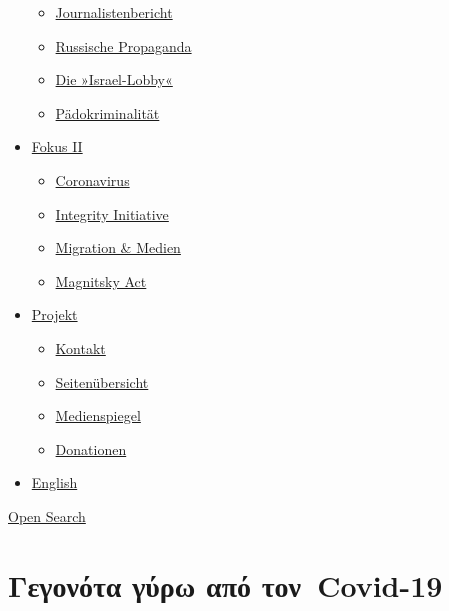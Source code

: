 \begin{itemize}
  \begin{itemize}
  \tightlist
  \item
    \href{https://swprs.org/bericht-eines-journalisten/}{Journalistenbericht}
  \item
    \href{https://swprs.org/russische-propaganda/}{Russische Propaganda}
  \item
    \href{https://swprs.org/die-israel-lobby-fakten-und-mythen/}{Die
    »Israel-Lobby«}
  \item
    \href{https://swprs.org/geopolitik-und-paedokriminalitaet/}{Pädokriminalität}
  \end{itemize}
\item
  \href{https://swprs.org/migration-und-medien/}{Fokus II}

  \begin{itemize}
  \tightlist
  \item
    \href{https://swprs.org/covid-19-hinweis-ii/}{Coronavirus}
  \item
    \href{https://swprs.org/die-integrity-initiative/}{Integrity
    Initiative}
  \item
    \href{https://swprs.org/migration-und-medien/}{Migration \& Medien}
  \item
    \href{https://swprs.org/der-fall-magnitsky/}{Magnitsky Act}
  \end{itemize}
\item
  \href{https://swprs.org/kontakt/}{Projekt}

  \begin{itemize}
  \tightlist
  \item
    \href{https://swprs.org/kontakt/}{Kontakt}
  \item
    \href{https://swprs.org/uebersicht/}{Seitenübersicht}
  \item
    \href{https://swprs.org/medienspiegel/}{Medienspiegel}
  \item
    \href{https://swprs.org/donationen/}{Donationen}
  \end{itemize}
\item
  \href{https://swprs.org/contact/}{English}
\end{itemize}

\protect\hyperlink{}{Open Search}

\hypertarget{ux3b3ux3b5ux3b3ux3bfux3bdux3ccux3c4ux3b1-ux3b3ux3cdux3c1ux3c9-ux3b1ux3c0ux3cc-ux3c4ux3bfux3bd-covid-19}{%
\section{Γεγονότα γύρω από
τον~Covid-19}\label{ux3b3ux3b5ux3b3ux3bfux3bdux3ccux3c4ux3b1-ux3b3ux3cdux3c1ux3c9-ux3b1ux3c0ux3cc-ux3c4ux3bfux3bd-covid-19}}

